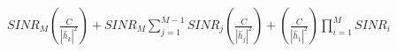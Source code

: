 \documentclass[preview]{standalone}
\begin{document}
\begin{align*}
SINR_M \left( \frac{C}{\left|{\hat{h}_k}\right|^2} \right) + SINR_M \sum_{j=1}^{M-1} SINR_j \left( \frac{C}{\left|{\hat{h}_j}\right|^2} \right) + \left( \frac{C}{\left|{\hat{h}_1}\right|^2} \right) \prod_{i=1}^{M} SINR_i
\end{align*}
\end{document}
